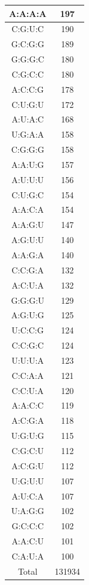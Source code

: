 \begin{center}
\begin{longtable}{c|c}
A:A:A:A & 197 \\ \hline
C:G:U:C & 190 \\ \hline
G:C:G:G & 189 \\ \hline
G:G:G:C & 180 \\ \hline
C:G:C:C & 180 \\ \hline
A:C:C:G & 178 \\ \hline
C:U:G:U & 172 \\ \hline
A:U:A:C & 168 \\ \hline
U:G:A:A & 158 \\ \hline
C:G:G:G & 158 \\ \hline
A:A:U:G & 157 \\ \hline
A:U:U:U & 156 \\ \hline
C:U:G:C & 154 \\ \hline
A:A:C:A & 154 \\ \hline
A:A:G:U & 147 \\ \hline
A:G:U:U & 140 \\ \hline
A:A:G:A & 140 \\ \hline
C:C:G:A & 132 \\ \hline
A:C:U:A & 132 \\ \hline
G:G:G:U & 129 \\ \hline
A:G:U:G & 125 \\ \hline
U:C:C:G & 124 \\ \hline
C:C:G:C & 124 \\ \hline
U:U:U:A & 123 \\ \hline
C:C:A:A & 121 \\ \hline
C:C:U:A & 120 \\ \hline
A:A:C:C & 119 \\ \hline
A:C:G:A & 118 \\ \hline
U:G:U:G & 115 \\ \hline
C:G:C:U & 112 \\ \hline
A:C:G:U & 112 \\ \hline
U:G:U:U & 107 \\ \hline
A:U:C:A & 107 \\ \hline
U:A:G:G & 102 \\ \hline
G:C:C:C & 102 \\ \hline
A:A:C:U & 101 \\ \hline
C:A:U:A & 100 \\ \hline
Total   & 131934 \\ \hline
\end{longtable}
\end{center}








